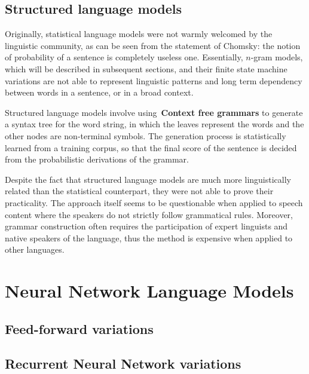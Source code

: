\subsection{Structured language models}
Originally, statistical language models were not warmly welcomed by the linguistic community, as can be seen from the 
statement of Chomsky: the notion of probability of a sentence is completely useless one. Essentially, $n$-gram models, which will be described in subsequent sections, 
and their finite state machine variations are not able to represent linguistic patterns and long term dependency between words in a sentence, or in a broad context. 

Structured language models involve using~\textbf{Context free grammars} to generate a syntax tree for the word string, in which the leaves represent the words and the 
other nodes are non-terminal symbols. The generation process is statistically learned from a training corpus, so that the final score of the sentence is decided from the probabilistic
derivations of the grammar. 

Despite the fact that structured language models are much more linguistically related than the statistical counterpart, they were not able to prove their practicality. The approach itself seems to be questionable when applied to speech content where the speakers do not strictly follow grammatical rules. Moreover, grammar construction often requires the participation of expert linguists and native speakers of the language, thus the method is expensive when applied to other languages. 

%
%
%

\section{Neural Network Language Models}

\subsection{Feed-forward variations}

\subsection{Recurrent Neural Network variations}
